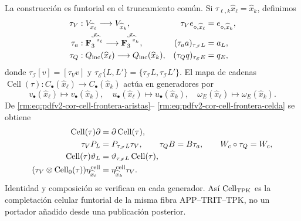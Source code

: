 La construcción es funtorial en el truncamiento común. Si
\(\tau_{\ell,k}\widehat x_\ell=\widehat x_k\), definimos
\begin{align*}
 \tau_V&:V_{\widehat x_\ell}\longrightarrow V_{\widehat x_k},&
 \tau_Ve_{\diamond,\widehat x_\ell}&=e_{\diamond,\widehat x_k},\\
 \tau_a&:\mathbf F_3^{\mathscr I_{\widehat x_\ell}}
          \longrightarrow\mathbf F_3^{\mathscr I_{\widehat x_k}},&
 (\tau_aa)_{\tau_{\mathscr I}L}&=a_L,\\
 \tau_Q&:Q_{\rm inc}(\widehat x_\ell)
          \longrightarrow Q_{\rm inc}(\widehat x_k),&
 (\tau_Qq)_{\tau_{\mathscr E}E}&=q_E,
\end{align*}
donde \(\tau_{\mathscr I}[v]=[\tau_Vv]\) y
\(\tau_{\mathscr E}\{L,L'\}=\{\tau_{\mathscr I}L,
\tau_{\mathscr I}L'\}\). El mapa de cadenas
\(\operatorname{Cell}(\tau):C_\bullet(\widehat x_\ell)
\to C_\bullet(\widehat x_k)\) actúa en generadores por
\begin{equation}
\label{rm:eq:pdfv2-cor-cell-truncamiento-generadores}
 v_\bullet(\widehat x_\ell)\mapsto v_\bullet(\widehat x_k),\quad
 u_\bullet(\widehat x_\ell)\mapsto u_\bullet(\widehat x_k),\quad
 \omega_E(\widehat x_\ell)\mapsto\omega_E(\widehat x_k).
\end{equation}
De \eqref{rm:eq:pdfv2-cor-cell-frontera-aristas}--
\eqref{rm:eq:pdfv2-cor-cell-frontera-celda} se obtiene
\begin{equation}
\label{rm:eq:pdfv2-cor-collar-naturalidad}
\begin{aligned}
 \operatorname{Cell}(\tau)\partial
 &=\partial\operatorname{Cell}(\tau),\\
 \tau_VP_L&=P_{\tau_{\mathscr I}L}\tau_V,\qquad
 \tau_QB=B\tau_a,\qquad W_c\circ\tau_Q=W_c,\\
 \operatorname{Cell}(\tau)\vartheta_L
 &=\vartheta_{\tau_{\mathscr I}L}\operatorname{Cell}(\tau),\\
 (\tau_V\otimes\operatorname{Cell}_0(\tau))
 \eta^{\rm cell}_{\widehat x_\ell}
 &=\eta^{\rm cell}_{\widehat x_k}\tau_V.
\end{aligned}
\end{equation}
Identidad y composición se verifican en cada generador. Así
\(\operatorname{Cell}_{\rm TPK}\) es la completación celular funtorial de
la misma fibra APP--TRIT--TPK, no un portador añadido desde una publicación
posterior.

